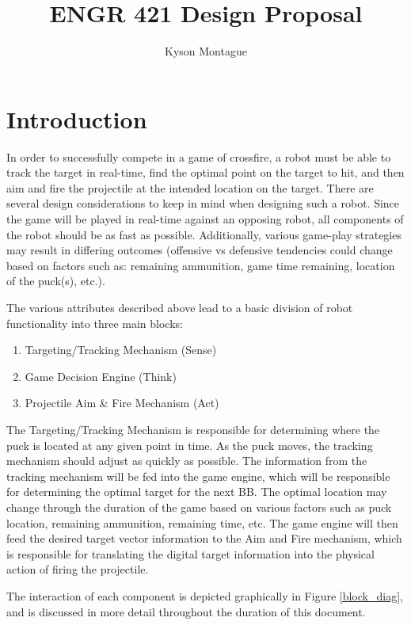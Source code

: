 \documentclass[letterpaper,10pt,onecolumn,titlepage]{article}
\title{ENGR 421 Design Proposal}
\author{Kyson Montague}
\begin{document}
\maketitle

\section{Introduction}
In order to successfully compete in a game of crossfire, a robot must be
able to track the target in real-time, find the optimal point on the target to
hit, and then aim and fire the projectile at the intended location on the
target.  There are several design considerations to keep in mind when
designing such a robot.  Since the game will be played in real-time against
an opposing robot, all components of the robot should be as fast as possible.
Additionally, various game-play strategies may result in differing outcomes (offensive vs defensive tendencies could change based on factors such as: remaining
ammunition, game time remaining, location of the puck(s), etc.).

The various attributes described above lead to a basic division of robot
functionality into three main blocks:
\begin{enumerate}
\item Targeting/Tracking Mechanism (Sense)
\item Game Decision Engine (Think)
\item Projectile Aim \& Fire Mechanism (Act)
\end{enumerate}

The Targeting/Tracking Mechanism is responsible for determining where the puck
is located at any given point in time.  As the puck moves, the tracking 
mechanism should adjust as quickly as possible.  The information from the
tracking mechanism will be fed into the game engine, which will be responsible
for determining the optimal target for the next BB.  The optimal location
may change through the duration of the game based on various factors such as
puck location, remaining ammunition, remaining time, etc. The game engine will
then feed the desired target vector information to the Aim and Fire mechanism,
which is responsible for translating the digital target information into the
physical action of firing the projectile.  

The interaction of each component is depicted graphically in Figure 
\ref{block_diag}, and is
discussed in more detail throughout the duration of this document.
\end{document}

